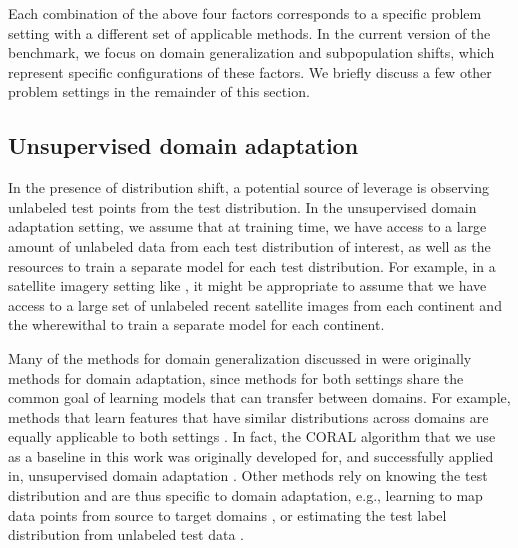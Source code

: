 Each combination of the above four factors corresponds to a specific problem setting with a different set of applicable methods.
In the current version of the \Wilds benchmark, we focus on domain generalization and subpopulation shifts, which represent specific configurations of these factors.
We briefly discuss a few other problem settings in the remainder of this section.

\subsection{Unsupervised domain adaptation}
In the presence of distribution shift, a potential source of leverage is observing unlabeled test points from the test distribution.
In the unsupervised domain adaptation setting, we assume that at training time, we have access to a large amount of unlabeled data from each test distribution of interest, as well as the resources to train a separate model for each test distribution.
For example, in a satellite imagery setting like \FMoW, it might be appropriate to assume that we have access to a large set of unlabeled recent satellite images from each continent and the wherewithal to train a separate model for each continent.

Many of the methods for domain generalization discussed in  were originally methods for domain adaptation, since methods for both settings share the common goal of learning models that can transfer between domains. For example, methods that learn features that have similar distributions across domains are equally applicable to both settings
\citep{bendavid2006analysis,long2015learning,sun2016return,
ganin2016domain,tzeng2017domain,shen2018WassersteinDG,wu2019domain}.
In fact, the CORAL algorithm that we use as a baseline in this work was originally developed for, and successfully applied in, unsupervised domain adaptation \citep{sun2016deep}.
Other methods rely on knowing the test distribution and are thus specific to domain adaptation, e.g., learning to map data points from source to target domains \citep{hoffman2018cycada},
or estimating the test label distribution from unlabeled test data \citep{saerens2002adjusting,zhang2013domain,lipton18icml,
azizzadenesheli2019reglabel,alexandari2020maximum,garg2020unified}.


